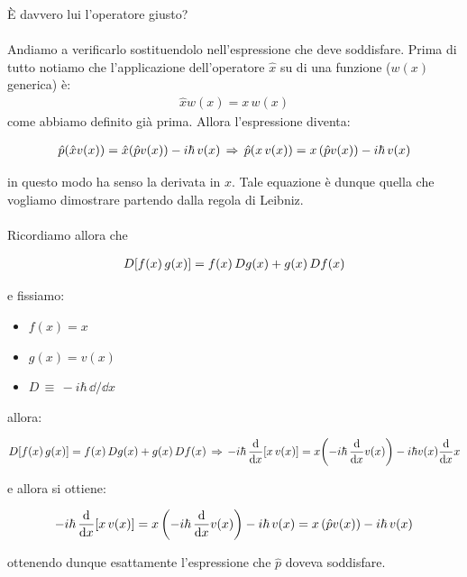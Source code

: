 \begin{myprf}
	È davvero lui l'operatore giusto?
	\\
	\\
	Andiamo a verificarlo sostituendolo nell'espressione che deve soddisfare. Prima di tutto notiamo che l'applicazione dell'operatore $\hat{x}$ su di una funzione ($w(x)$ generica) è:
\begin{align*}
	\hat{x} w(x) = x \, w(x)
\end{align*}
	come abbiamo definito già prima. Allora l'espressione diventa:
	
\begin{align*}
	\hat{p}\qty(\hat{x}v(x)) =  \hat{x}\qty(\hat{p}v(x)) - i \hbar \, v(x) \, \Rightarrow \, \hat{p}\qty(x \, v(x)) = x \, \qty(\hat{p}v(x)) - i \hbar \, v(x)
\end{align*}
	
	in questo modo ha senso la derivata in $x$. Tale equazione è dunque quella che vogliamo dimostrare partendo dalla regola di Leibniz.
	\\
	\\
	Ricordiamo allora che

\begin{align*}
	D\qty[f(x)\,g(x)] = f(x) \, Dg(x) + g(x)\, Df(x)
\end{align*}
	
	e fissiamo:

\begin{itemize}
	\item $f(x) = x $
	\item $g(x) = v(x) $
	\item $D \, \equiv \, - i \hbar \, \dd/\dd x$
\end{itemize}

	allora:
	
\begin{align*}
	D\qty[f(x)\,g(x)] = f(x) \, Dg(x) + g(x) \, Df(x) \, \Rightarrow \, - i \hbar \, \dv{x} \qty[x \, v(x)] = x\qty(- i \hbar \, \dv{x} v(x)) - i \hbar  v(x)  \dv{x} x 
\end{align*}

	e allora si ottiene:
	
\begin{align*}
	- i \hbar \, \dv{x} \qty[x \, v(x)] = x\, \qty(- i \hbar \, \dv{x} v(x)) - i \hbar \,  v(x) = x \, \qty(\hat{p}v(x)) - i \hbar \, v(x)
\end{align*}
	
	ottenendo dunque esattamente l'espressione che $\hat{p}$ doveva soddisfare.

\end{myprf}

